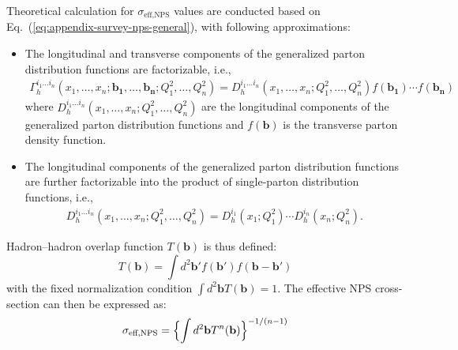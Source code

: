 \begin{survey}
Theoretical calculation for $\sigma_{\text{eff,NPS}}$ values are conducted based on Eq.~(\ref{eq:appendix-survey-nps-general}), with following approximations:
\begin{itemize}
    \item The longitudinal and transverse components of the generalized parton distribution functions are factorizable, i.e.,
    \begin{equation}
        \label{eq:appendix-survey-parton-transverse-factorization}
        \begin{aligned}
            \Gamma_h^{i_1\dots i_n}(x_1,\dots,x_n;\mathbf{b_1},\dots,\mathbf{b_n};Q_1^2,\dots,Q_n^2)
            =
            D_h^{i_1\dots i_n}(x_1,\dots,x_n;Q_1^2,\dots,Q_n^2) f(\mathbf{b_1})\cdots f(\mathbf{b_n})
        \end{aligned}
    \end{equation}
    where $D_h^{i_1\dots i_n}(x_1,\dots,x_n;Q_1^2,\dots,Q_n^2)$ are the longitudinal components of the generalized parton distribution functions and $f(\mathbf{b})$ is the transverse parton density function.
    \item The longitudinal components of the generalized parton distribution functions are further factorizable into the product of single-parton distribution functions, i.e.,
    \begin{equation}
        \label{eq:appendix-survey-parton-longitudinal-factorization}
        \begin{aligned}
            D_h^{i_1\dots i_n}(x_1,\dots,x_n;Q_1^2,\dots,Q_n^2)
            =
            D_h^{i_1}(x_1;Q_1^2)\cdots D_h^{i_n}(x_n;Q_n^2).
        \end{aligned}
    \end{equation}
\end{itemize}

Hadron--hadron overlap function $T(\mathbf{b})$ is thus defined:
\begin{equation}
    \label{eq:appendix-survey-hadron-overlap}
    T(\mathbf{b}) = \int d^2\mathbf{b'} f(\mathbf{b'}) f(\mathbf{b - b'})
\end{equation}
with the fixed normalization condition $\int d^2\mathbf{b} T(\mathbf{b}) = 1$. The effective NPS cross-section can then be expressed as:
\begin{equation}
    \label{eq:appendix-survey-nps-eff-xsec-from-overlap}
    \sigma_{\text{eff,NPS}} = \Bigl\{ \int d^2\mathbf{b} T^n(\mathbf{b}) \Bigr\}^{-1/(n-1)}
\end{equation}


\end{survey}
